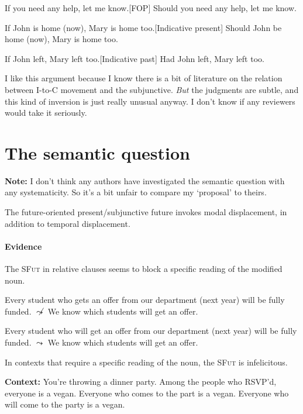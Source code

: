 \documentclass{linghandout}
\newcommand{\sfut}{\textsc{SFut}\xspace}
\begin{document}
\pex
\a If you need any help, let me know.\hfill [FOP]
\a Should you need any help, let me know.
\xe 

\pex 
\a If John is home (now), Mary is home too.\hfill [Indicative present]
\a{}Should John be home (now), Mary is home too.
\xe 

\pex 
\a If John left, Mary left too.\hfill [Indicative past]
\a{}Had John left, Mary left too.
\xe 

\begin{fancybox}{}
I like this argument because I know there is a bit of literature on the relation between I-to-C movement and the subjunctive. \textit{But} the judgments are subtle, and this kind of inversion is just really unusual anyway. I don't know if any reviewers would take it seriously.
\end{fancybox}

\section{The semantic question}

\textbf{Note:} I don't think any authors have investigated the semantic question with any systematicity. So it's a bit unfair to compare my `proposal' to theirs.

\begin{fancybox}{}
    The future-oriented present/subjunctive future invokes modal displacement, in addition to temporal displacement. %
\end{fancybox}

\paragraph{Evidence} The \sfut in relative clauses seems to block a specific reading of the modified noun.

\pex 
\a Every student who gets an offer from our department (next year) will be fully funded.
\a $\not\leadsto$ We know which students will get an offer.
\xe 

\pex 
\a Every student who will get an offer from our department (next year) will be fully funded.
\a $\leadsto$ We know which students will get an offer.
\xe 

In contexts that require a specific reading of the noun, the \sfut is infelicitous.

\pex\textbf{Context:} You're throwing a dinner party. Among the people who RSVP'd, everyone is a vegan. 
\a\ljudge{$\#$}Everyone who comes to the part is a vegan.
\a Everyone who will come to the party is a vegan.
\xe 





\end{document}

